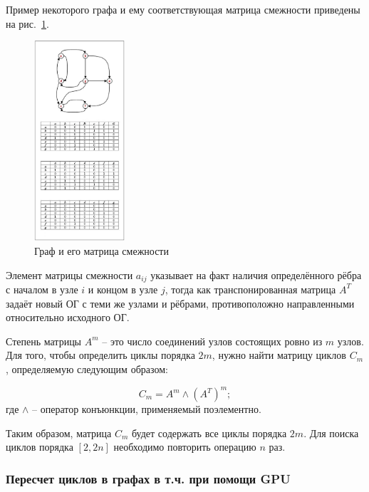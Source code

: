 Пример некоторого графа и ему соответствующая матрица смежности приведены на рис.~\ref{fig.rndhpcedt.2021.11.14.01}.

\begin{figure}[!ht]
	\centering
	\includegraphics[width=0.3\textwidth]{ResearchNotes/rndhpc_not_edt_2021_11_14/adj_matrix.png}
	\caption{Граф и его матрица смежности}\label{fig.rndhpcedt.2021.11.14.01}
\end{figure}

Элемент матрицы смежности $a_{ij}$ указывает на факт наличия определённого рёбра с началом в узле $i$ и концом в узле $j$, тогда как транспонированная матрица $A^T$ задаёт новый ОГ с теми же узлами и рёбрами, противоположно направленными относительно исходного ОГ.

Степень матрицы $A^m$ -- это число соединений узлов состоящих ровно из $m$ узлов. Для того, чтобы определить циклы порядка $2m$, нужно найти матрицу циклов $C_m$, определяемую следующим образом: %

\begin{equation}\label{eq.rndhpcedt.2021.11.14.02}
    C_m = A^m \wedge (A^T)^m;
\end{equation}
где $\wedge$ -- оператор конъюнкции, применяемый поэлементно.

Таким образом, матрица $C_m$ будет содержать все циклы порядка $2m$. Для поиска циклов порядка $[2, 2n]$ необходимо повторить операцию $n$ раз.

\subsubsection{Пересчет циклов в графах в т.ч. при помощи GPU}

